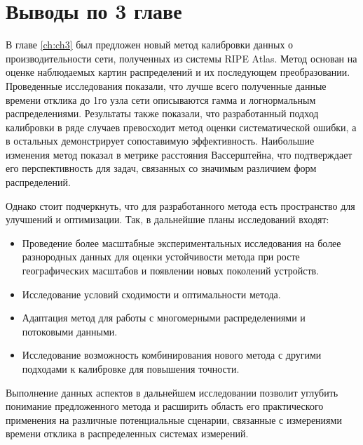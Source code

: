 
\section{Выводы по 3 главе}\label{subsec:ch3/sect7}


В главе \ref{ch:ch3} был предложен новый метод калибровки данных о производительности сети, полученных из системы RIPE Atlas. Метод основан на оценке наблюдаемых картин распределений и их последующем преобразовании. 
Проведенные исследования показали, что лучше всего полученные данные времени отклика до 1го узла сети описываются гамма и логнормальным распределениями. Результаты также показали, что разработанный подход калибровки в ряде случаев превосходит метод оценки систематической ошибки, а в остальных демонстрирует сопоставимую эффективность. Наибольшие изменения метод показал в метрике расстояния Вассерштейна, что подтверждает его перспективность для задач, связанных со значимым различием форм распределений.

Однако стоит подчеркнуть, что для разработанного метода есть пространство для улучшений и оптимизации. Так, в дальнейшие планы исследований входят:

\begin{itemize}
	\item Проведение более масштабные экспериментальных исследования на более разнородных данных для оценки устойчивости метода при росте географических масштабов и появлении новых поколений устройств.
	\item Исследование условий сходимости и оптимальности метода.
	\item Адаптация метод для работы с многомерными распределениями и
	потоковыми данными.
	\item Исследование возможность комбинирования нового метода с другими
	подходами к калибровке для повышения точности.
\end{itemize}

Выполнение данных аспектов в дальнейшем исследовании позволит углубить понимание предложенного метода и расширить область
его практического применения на различные потенциальные сценарии, связанные с измерениями времени отклика в распределенных системах измерений.


\FloatBarrier
